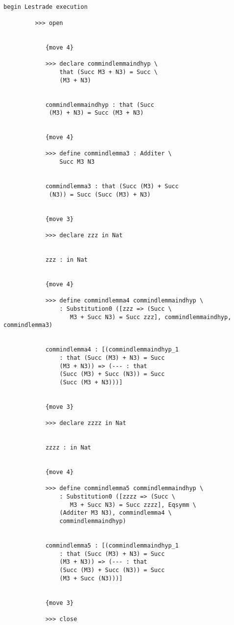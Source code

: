 \documentclass[12pt]{article}
\begin{document}
\begin{verbatim}

begin Lestrade execution

         >>> open


            {move 4}

            >>> declare commindlemmaindhyp \
                that (Succ M3 + N3) = Succ \
                (M3 + N3)


            commindlemmaindhyp : that (Succ 
             (M3) + N3) = Succ (M3 + N3)


            {move 4}

            >>> define commindlemma3 : Additer \
                Succ M3 N3


            commindlemma3 : that (Succ (M3) + Succ 
             (N3)) = Succ (Succ (M3) + N3)


            {move 3}

            >>> declare zzz in Nat


            zzz : in Nat


            {move 4}

            >>> define commindlemma4 commindlemmaindhyp \
                : Substitution0 ([zzz => (Succ \
                   M3 + Succ N3) = Succ zzz], commindlemmaindhyp, commindlemma3)


            commindlemma4 : [(commindlemmaindhyp_1 
                : that (Succ (M3) + N3) = Succ 
                (M3 + N3)) => (--- : that 
                (Succ (M3) + Succ (N3)) = Succ 
                (Succ (M3 + N3)))]


            {move 3}

            >>> declare zzzz in Nat


            zzzz : in Nat


            {move 4}

            >>> define commindlemma5 commindlemmaindhyp \
                : Substitution0 ([zzzz => (Succ \
                   M3 + Succ N3) = Succ zzzz], Eqsymm \
                (Additer M3 N3), commindlemma4 \
                commindlemmaindhyp)


            commindlemma5 : [(commindlemmaindhyp_1 
                : that (Succ (M3) + N3) = Succ 
                (M3 + N3)) => (--- : that 
                (Succ (M3) + Succ (N3)) = Succ 
                (M3 + Succ (N3)))]


            {move 3}

            >>> close



\end{verbatim}
\end{document}
